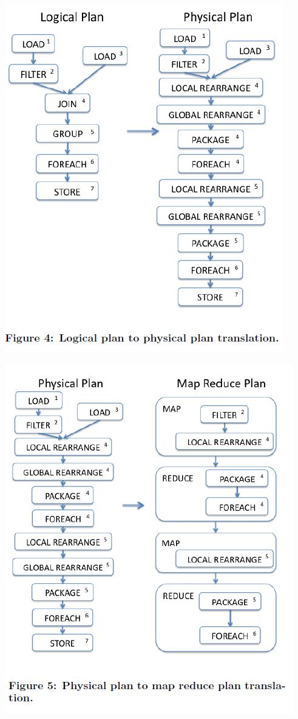 \begin{frame}
\centerline{\includegraphics[scale=0.40]{Images/Logical_Physical.JPG} }
\let\thefootnote\relax{}
\end{frame}

\begin{frame}
\centerline{\includegraphics[scale=0.40]{Images/Physical_MapReduce.JPG}}
\let\thefootnote\relax{}
\end{frame}

